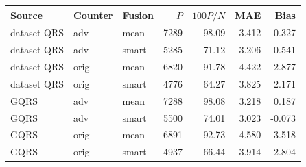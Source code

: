 \begin{tabular}{lllrrrr}
\toprule
Source & Counter & Fusion & $P$ & $100P/N$ & MAE & Bias \\
\midrule
dataset QRS & adv & mean & 7289 & 98.09 & 3.412 & -0.327 \\
dataset QRS & adv & smart & 5285 & 71.12 & 3.206 & -0.541 \\
dataset QRS & orig & mean & 6820 & 91.78 & 4.422 & 2.877 \\
dataset QRS & orig & smart & 4776 & 64.27 & 3.825 & 2.171 \\
GQRS & adv & mean & 7288 & 98.08 & 3.218 & 0.187 \\
GQRS & adv & smart & 5500 & 74.01 & 3.023 & -0.073 \\
GQRS & orig & mean & 6891 & 92.73 & 4.580 & 3.518 \\
GQRS & orig & smart & 4937 & 66.44 & 3.914 & 2.804 \\
\bottomrule
\end{tabular}
